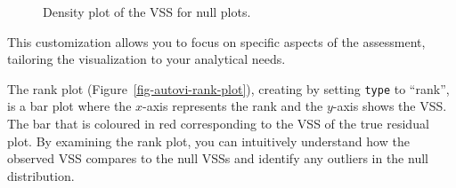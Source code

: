 \documentclass[
doublespace,
  times]{anzsauth}
\newenvironment{Shaded}{\begin{snugshade}}{\end{snugshade}}
\newcommand{\AttributeTok}[1]{\textcolor[rgb]{0.40,0.45,0.13}{#1}}
\newcommand{\FunctionTok}[1]{\textcolor[rgb]{0.28,0.35,0.67}{#1}}
\newcommand{\NormalTok}[1]{\textcolor[rgb]{0.00,0.23,0.31}{#1}}
\newcommand{\SpecialCharTok}[1]{\textcolor[rgb]{0.37,0.37,0.37}{#1}}
\newcommand{\StringTok}[1]{\textcolor[rgb]{0.13,0.47,0.30}{#1}}
\begin{document}
\begin{figure}[H]


\caption{\label{fig-autovi-summary-plot-option}Density plot of the VSS
for null plots.}

\end{figure}%

This customization allows you to focus on specific aspects of the
assessment, tailoring the visualization to your analytical needs.

The rank plot (Figure~\ref{fig-autovi-rank-plot}), creating by setting
\texttt{type} to ``rank'', is a bar plot where the \(x\)-axis represents
the rank and the \(y\)-axis shows the VSS. The bar that is coloured in
red corresponding to the VSS of the true residual plot. By examining the
rank plot, you can intuitively understand how the observed VSS compares
to the null VSSs and identify any outliers in the null distribution.

\begin{Shaded}
\end{Shaded}
\end{document}
